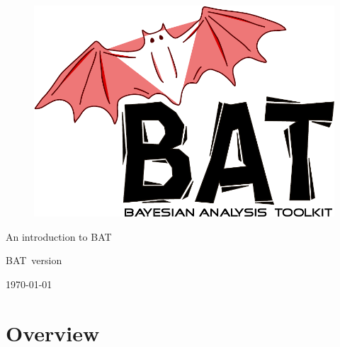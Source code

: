 \documentclass[11pt, a4paper]{article}
\newcommand{\bat}{{\sc BAT}}
\newcommand{\version}{version~\versionno}
\begin{document}

\thispagestyle{empty}

\begin{figure}
\includegraphics[scale=0.25]{bat}
\end{figure}

\vspace*{1cm}

\begin{center}


{\Large An introduction to \bat}
\\

\vspace{1cm}

{\large \bat\ \version}

\end{center}

\thispagestyle{empty}

\vfill

\begin{center}
\today
\end{center}

\pagebreak


\thispagestyle{empty}

\enlargethispage{2cm}

\tableofcontents

\section{Overview}
\end{document}
